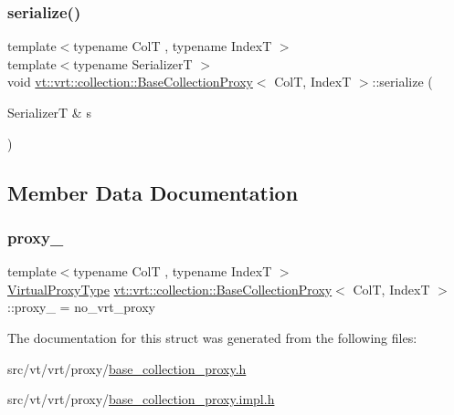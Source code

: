 \mbox{\label{structvt_1_1vrt_1_1collection_1_1_base_collection_proxy_afe94716260317db0d8a720c34beaa807}} 
\subsubsection{\texorpdfstring{serialize()}{serialize()}}
{\footnotesize\ttfamily template$<$typename ColT , typename IndexT $>$ \\
template$<$typename SerializerT $>$ \\
void \hyperlink{structvt_1_1vrt_1_1collection_1_1_base_collection_proxy}{vt\+::vrt\+::collection\+::\+Base\+Collection\+Proxy}$<$ ColT, IndexT $>$\+::serialize (\begin{DoxyParamCaption}\item[{SerializerT \&}]{s }\end{DoxyParamCaption})\hspace{0.3cm}{\ttfamily [inline]}}



\subsection{Member Data Documentation}
\mbox{\label{structvt_1_1vrt_1_1collection_1_1_base_collection_proxy_aba04cfd81d3822ee2a2b16cb17ebf7f6}} 
\subsubsection{\texorpdfstring{proxy\+\_\+}{proxy\_}}
{\footnotesize\ttfamily template$<$typename ColT , typename IndexT $>$ \\
\hyperlink{namespacevt_a1b417dd5d684f045bb58a0ede70045ac}{Virtual\+Proxy\+Type} \hyperlink{structvt_1_1vrt_1_1collection_1_1_base_collection_proxy}{vt\+::vrt\+::collection\+::\+Base\+Collection\+Proxy}$<$ ColT, IndexT $>$\+::proxy\+\_\+ = no\+\_\+vrt\+\_\+proxy\hspace{0.3cm}{\ttfamily [protected]}}



The documentation for this struct was generated from the following files\+:\begin{DoxyCompactItemize}
\item 
src/vt/vrt/proxy/\hyperlink{base__collection__proxy_8h}{base\+\_\+collection\+\_\+proxy.\+h}\item 
src/vt/vrt/proxy/\hyperlink{base__collection__proxy_8impl_8h}{base\+\_\+collection\+\_\+proxy.\+impl.\+h}\end{DoxyCompactItemize}
